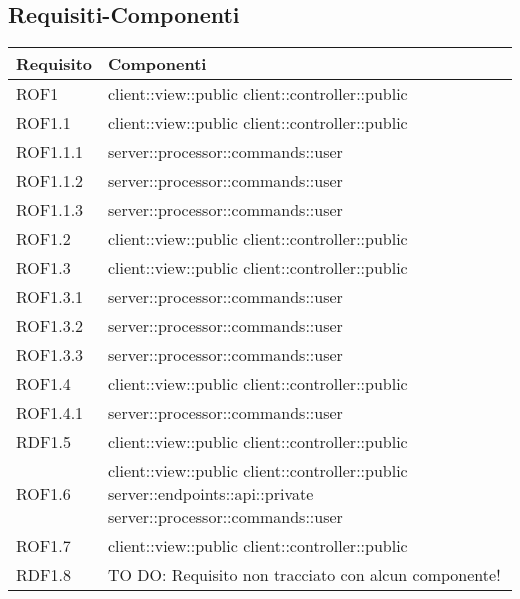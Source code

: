 \subsection{Requisiti-Componenti} %
\label{sub:componenti_requisiti}
\begin{center}
\def\arraystretch{1.5}
\bgroup
\begin{longtable}{| p{4cm} | p{8cm} |}
\hline
\textbf{Requisito} & \textbf{Componenti} \\
\hline
ROF1 & client::view::public \newline client::controller::public \\
\hline
ROF1.1 & client::view::public \newline client::controller::public \\
\hline
ROF1.1.1 & server::processor::commands::user \\
\hline
ROF1.1.2 & server::processor::commands::user \\
\hline
ROF1.1.3 & server::processor::commands::user \\
\hline
ROF1.2 & client::view::public \newline client::controller::public \\
\hline
ROF1.3 & client::view::public \newline client::controller::public \\
\hline
ROF1.3.1 & server::processor::commands::user \\
\hline
ROF1.3.2 & server::processor::commands::user \\
\hline
ROF1.3.3 & server::processor::commands::user \\
\hline
ROF1.4 & client::view::public \newline client::controller::public \\
\hline
ROF1.4.1 & server::processor::commands::user \\
\hline
RDF1.5 & client::view::public \newline client::controller::public \\
\hline
ROF1.6 & client::view::public \newline client::controller::public \newline server::endpoints::api::private \newline server::processor::commands::user \\
\hline
ROF1.7 & client::view::public \newline client::controller::public \\
\hline
RDF1.8 & TO DO: Requisito non tracciato con alcun componente! \\

\end{longtable}
\end{center}
